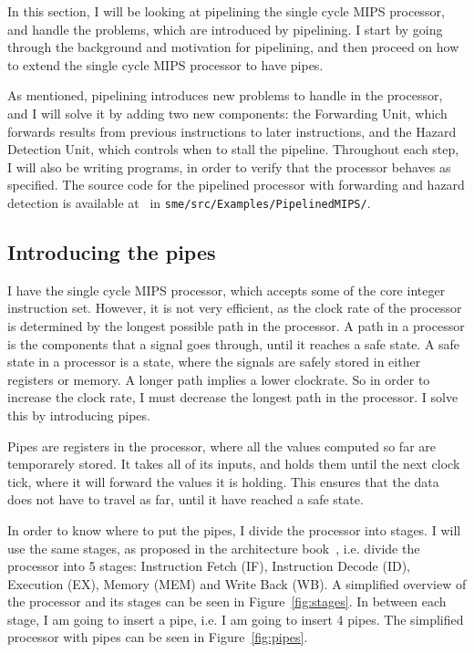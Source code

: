 In this section, I will be looking at pipelining the single cycle MIPS
processor, and handle the problems, which are introduced by pipelining. I
start by going through the background and motivation for pipelining, and then
proceed on how to extend the single cycle MIPS processor to have pipes.

As mentioned, pipelining introduces new problems to handle in the processor,
and I will solve it by adding two new components: the Forwarding Unit, which
forwards results from previous instructions to later instructions, and the
Hazard Detection Unit, which controls when to stall the pipeline. Throughout
each step, I will also be writing programs, in order to verify that the
processor behaves as specified. The source code for the pipelined processor
with forwarding and hazard detection is available at~\cite{ref:github} in
\texttt{sme/src/Examples/PipelinedMIPS/}.

\subsection{Introducing the pipes}\label{sec:intro-pipe}
I have the single cycle MIPS processor, which accepts some of the core integer
instruction set. However, it is not very efficient, as the clock rate of the
processor is determined by the longest possible path in the processor. A path
in a processor is the components that a signal goes through, until it reaches a
safe state. A safe state in a processor is a state, where the signals are safely
stored in either registers or memory. A longer path implies a lower clockrate.
So in order to increase the clock rate, I must decrease the longest path in the
processor. I solve this by introducing pipes.

Pipes are registers in the processor, where all the values computed so far are
temporarely stored. It takes all of its inputs, and holds them until the next
clock tick, where it will forward the values it is holding. This ensures that
the data does not have to travel as far, until it have reached a safe state.

In order to know where to put the pipes, I divide the processor into stages.  I
will use the same stages, as proposed in the architecture book~\cite{ref:ark},
i.e. divide the processor into 5 stages: Instruction Fetch (IF), Instruction
Decode (ID), Execution (EX), Memory (MEM) and Write Back (WB). A simplified
overview of the processor and its stages can be seen in Figure~\ref{fig:stages}.
In between each stage, I am going to insert a pipe, i.e. I am
going to insert 4 pipes. The simplified processor with pipes can be seen in
Figure~\ref{fig:pipes}.

